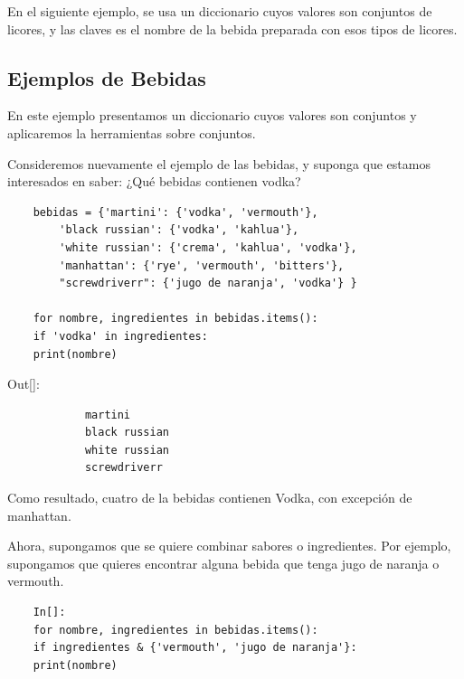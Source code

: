 En el siguiente ejemplo, se usa un diccionario cuyos valores son conjuntos de licores, y las claves es el nombre de la bebida preparada con esos tipos de licores.  

\subsection{Ejemplos de Bebidas}


En este ejemplo presentamos un diccionario cuyos valores son conjuntos y aplicaremos la herramientas sobre conjuntos.

Consideremos nuevamente el ejemplo de las bebidas, y suponga que estamos interesados en saber: ¿Qué bebidas contienen vodka? 

\hspace{-2.5cm}{\ttfamily \scriptsize bebidas.py}  \vspace{-0.5cm}
\begin{lstlisting}
	bebidas = {'martini': {'vodka', 'vermouth'},
		'black russian': {'vodka', 'kahlua'},
		'white russian': {'crema', 'kahlua', 'vodka'},
		'manhattan': {'rye', 'vermouth', 'bitters'},
		"screwdriverr": {'jugo de naranja', 'vodka'} }
	
	for nombre, ingredientes in bebidas.items():
	if 'vodka' in ingredientes:
	print(nombre)
\end{lstlisting}

{\ttfamily\scriptsize\scriptsize \noindent Out[]: \vspace{-0.3cm}	
	{\color{blue} 	
		\begin{verbatim}
			martini
			black russian
			white russian
			screwdriverr
		\end{verbatim}
}}

\noindent Como resultado, cuatro de la bebidas contienen Vodka, con excepción de manhattan.  


Ahora, supongamos que se quiere combinar sabores o ingredientes. Por ejemplo, supongamos que quieres encontrar alguna bebida que tenga jugo de naranja o vermouth.

\begin{lstlisting}
	In[]:
	for nombre, ingredientes in bebidas.items():
	if ingredientes & {'vermouth', 'jugo de naranja'}:
	print(nombre)
\end{lstlisting}

